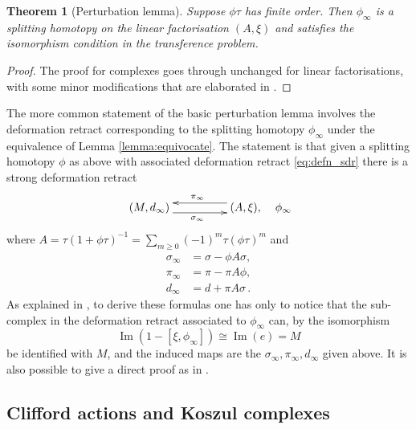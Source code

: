 \documentclass[english,letter paper,12pt,leqno]{article}
\newtheorem{theorem}{Theorem}[section]
\theoremstyle{example}
\numberwithin{equation}{section}
\def\im{\operatorname{Im}}
\begin{document}
\begin{theorem}[Perturbation lemma]\label{theorem:pertlemma} Suppose $\phi \tau$ has finite order. Then $\phi_\infty$ is a splitting homotopy on the linear factorisation $(A, \xi)$ and satisfies the isomorphism condition in the transference problem.
\end{theorem}
\begin{proof}
The proof for complexes \cite[p.886]{barneslambe} goes through unchanged for linear factorisations, with some minor modifications that are elaborated in \cite[\S 2.5]{lgdual}.
\end{proof}

The more common statement of the basic perturbation lemma involves the deformation retract corresponding to the splitting homotopy $\phi_\infty$ under the equivalence of Lemma \ref{lemma:equivocate}. The statement is that given a splitting homotopy $\phi$ as above with associated deformation retract \eqref{eq:defn_sdr} there is a strong deformation retract
\begin{equation}\label{eq:perturbedsdr}
\xymatrix@C+2pc{
(M,d_\infty) \ar@<-1ex>[r]_{\sigma_\infty} & (A, \xi), \ar@<-1ex>[l]_{\pi_\infty}
} \quad \phi_\infty
\end{equation}
where $A = \tau( 1 + \phi \tau )^{-1} = \sum_{m \ge 0} (-1)^m \tau (\phi \tau)^m$ and
\begin{align*}
\sigma_\infty &= \sigma - \phi A \sigma,\\
\pi_\infty &= \pi - \pi A \phi,\\
d_\infty &= d + \pi A \sigma\,.
\end{align*}
As explained in \cite{barneslambe}, to derive these formulas one has only to notice that the sub-complex in the deformation retract associated to $\phi_\infty$ can, by the isomorphism
\[
\im(1 - [\xi, \phi_\infty]) \cong \im(e) = M
\]
be identified with $M$, and the induced maps are the $\sigma_\infty, \pi_\infty, d_\infty$ given above. It is also possible to give a direct proof as in \cite{crainic}. %

\subsection{Clifford actions and Koszul complexes}\label{section:cliffordactkos}
\end{document}
